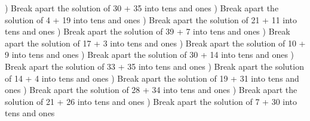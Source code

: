 \documentclass{article}%
\begin{document}
) Break apart the solution of 30 + 35 into tens and ones%
\newline%
\newline%
) Break apart the solution of 4 + 19 into tens and ones%
\newline%
\newline%
) Break apart the solution of 21 + 11 into tens and ones%
\newline%
\newline%
) Break apart the solution of 39 + 7 into tens and ones%
\newline%
\newline%
) Break apart the solution of 17 + 3 into tens and ones%
\newline%
\newline%
) Break apart the solution of 10 + 9 into tens and ones%
\newline%
\newline%
) Break apart the solution of 30 + 14 into tens and ones%
\newline%
\newline%
) Break apart the solution of 33 + 35 into tens and ones%
\newline%
\newline%
) Break apart the solution of 14 + 4 into tens and ones%
\newline%
\newline%
) Break apart the solution of 19 + 31 into tens and ones%
\newline%
\newline%
) Break apart the solution of 28 + 34 into tens and ones%
\newline%
\newline%
) Break apart the solution of 21 + 26 into tens and ones%
\newline%
\newline%
) Break apart the solution of 7 + 30 into tens and ones%
\end{document}
